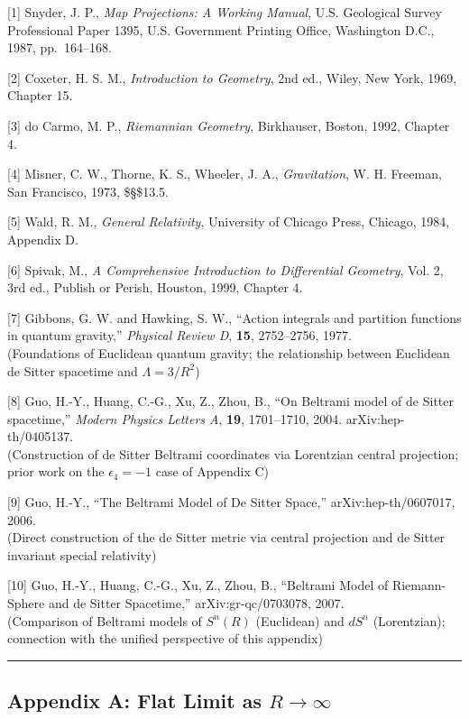 \documentclass[a4paper,11pt]{article}
\theoremstyle{definition}
\begin{document}
{[}1{]} Snyder, J. P., \emph{Map Projections: A Working Manual}, U.S. Geological Survey Professional Paper 1395, U.S. Government Printing Office, Washington D.C., 1987, pp.~164--168.

{[}2{]} Coxeter, H. S. M., \emph{Introduction to Geometry}, 2nd ed., Wiley, New York, 1969, Chapter 15.

{[}3{]} do Carmo, M. P., \emph{Riemannian Geometry}, Birkhauser, Boston, 1992, Chapter 4.

{[}4{]} Misner, C. W., Thorne, K. S., Wheeler, J. A., \emph{Gravitation}, W. H. Freeman, San Francisco, 1973, \$\S\$13.5.

{[}5{]} Wald, R. M., \emph{General Relativity}, University of Chicago Press, Chicago, 1984, Appendix D.

{[}6{]} Spivak, M., \emph{A Comprehensive Introduction to Differential Geometry}, Vol. 2, 3rd ed., Publish or Perish, Houston, 1999, Chapter 4.

{[}7{]} Gibbons, G. W. and Hawking, S. W., ``Action integrals and partition functions in quantum gravity,'' \emph{Physical Review D}, \textbf{15}, 2752--2756, 1977.\\
(Foundations of Euclidean quantum gravity; the relationship between Euclidean de Sitter spacetime and \(\Lambda = 3/R^2\))

{[}8{]} Guo, H.-Y., Huang, C.-G., Xu, Z., Zhou, B., ``On Beltrami model of de Sitter spacetime,'' \emph{Modern Physics Letters A}, \textbf{19}, 1701--1710, 2004. arXiv:hep-th/0405137.\\
(Construction of de Sitter Beltrami coordinates via Lorentzian central projection; prior work on the \(\epsilon_4=-1\) case of Appendix C)

{[}9{]} Guo, H.-Y., ``The Beltrami Model of De Sitter Space,'' arXiv:hep-th/0607017, 2006.\\
(Direct construction of the de Sitter metric via central projection and de Sitter invariant special relativity)

{[}10{]} Guo, H.-Y., Huang, C.-G., Xu, Z., Zhou, B., ``Beltrami Model of Riemann-Sphere and de Sitter Spacetime,'' arXiv:gr-qc/0703078, 2007.\\
(Comparison of Beltrami models of \(S^n(R)\) (Euclidean) and \(dS^n\) (Lorentzian); connection with the unified perspective of this appendix)

\begin{center}\rule{0.5\linewidth}{0.5pt}\end{center}

\subsection{\texorpdfstring{Appendix A: Flat Limit as \(R \to \infty\)}{Appendix A: Flat Limit as R \textbackslash to \textbackslash infty}}\label{appendix-a-flat-limit-as-r-to-infty}
\end{document}
